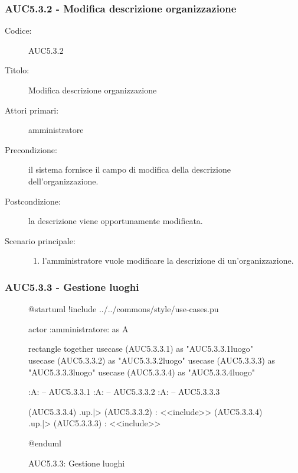 \documentclass[../../../analisi-dei-requisiti.tex]{subfiles}
\begin{document}
\subsubsection{AUC5.3.2 - Modifica descrizione organizzazione}%
\label{subs:AUC5.3.2}
\begin{description}
  \item[Codice:] AUC5.3.2
  \item[Titolo:] Modifica descrizione organizzazione
  \item[Attori primari:] amministratore
  \item[Precondizione:] il sistema fornisce il campo di modifica della descrizione dell'organizzazione.
  \item[Postcondizione:] la descrizione viene opportunamente modificata.
  \item[Scenario principale:]
  \begin{enumerate}
    \item l'amministratore vuole modificare la descrizione di un'organizzazione.
  \end{enumerate}
\end{description}

\subsubsection{AUC5.3.3 - Gestione luoghi}%
\label{subs:AUC5.3.3}

\begin{figure}[h!]
  \centering
  \begin{plantuml}
  @startuml
  !include ../../commons/style/use-cases.pu

  actor :amministratore: as A

  rectangle {
    together {
      usecase (AUC5.3.3.1) as "AUC5.3.3.1\nAggiungi luogo"
      usecase (AUC5.3.3.2) as "AUC5.3.3.2\nEliminazione luogo"
      usecase (AUC5.3.3.3) as "AUC5.3.3.3\nModifica luogo"
    }
    usecase (AUC5.3.3.4) as "AUC5.3.3.4\nSeleziona luogo"
  }

  :A: -- AUC5.3.3.1
  :A: -- AUC5.3.3.2
  :A: -- AUC5.3.3.3

  (AUC5.3.3.4) .up.|> (AUC5.3.3.2) : <<include>>
  (AUC5.3.3.4) .up.|> (AUC5.3.3.3) : <<include>>

  @enduml
  \end{plantuml}
  \caption{AUC5.3.3: Gestione luoghi}
  \label{fig:AUC5_3_3}
\end{figure}
\end{document}
